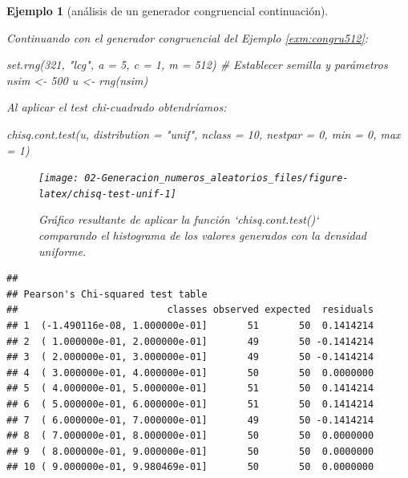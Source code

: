 \documentclass[
]{book}
\newenvironment{Shaded}{\begin{snugshade}}{\end{snugshade}}
\newcommand{\AttributeTok}[1]{\textcolor[rgb]{0.77,0.63,0.00}{#1}}
\newcommand{\CommentTok}[1]{\textcolor[rgb]{0.56,0.35,0.01}{\textit{#1}}}
\newcommand{\DecValTok}[1]{\textcolor[rgb]{0.00,0.00,0.81}{#1}}
\newcommand{\FunctionTok}[1]{\textcolor[rgb]{0.00,0.00,0.00}{#1}}
\newcommand{\NormalTok}[1]{#1}
\newcommand{\OtherTok}[1]{\textcolor[rgb]{0.56,0.35,0.01}{#1}}
\newcommand{\StringTok}[1]{\textcolor[rgb]{0.31,0.60,0.02}{#1}}
\theoremstyle{break}
\newtheorem{example}{Ejemplo}[chapter]
\theoremstyle{nonumberplain}
\begin{document}
\begin{example}[análisis de un generador congruencial continuación]
\protect\hypertarget{exm:congru512b}{}\label{exm:congru512b}

Continuando con el generador congruencial del Ejemplo \ref{exm:congru512}:

\begin{Shaded}
\begin{Highlighting}[]
\FunctionTok{set.rng}\NormalTok{(}\DecValTok{321}\NormalTok{, }\StringTok{"lcg"}\NormalTok{, }\AttributeTok{a =} \DecValTok{5}\NormalTok{, }\AttributeTok{c =} \DecValTok{1}\NormalTok{, }\AttributeTok{m =} \DecValTok{512}\NormalTok{)  }\CommentTok{\# Establecer semilla y parámetros}
\NormalTok{nsim }\OtherTok{\textless{}{-}} \DecValTok{500}
\NormalTok{u }\OtherTok{\textless{}{-}} \FunctionTok{rng}\NormalTok{(nsim)}
\end{Highlighting}
\end{Shaded}

Al aplicar el test chi-cuadrado obtendríamos:

\begin{Shaded}
\begin{Highlighting}[]
\FunctionTok{chisq.cont.test}\NormalTok{(u, }\AttributeTok{distribution =} \StringTok{"unif"}\NormalTok{, }
                \AttributeTok{nclass =} \DecValTok{10}\NormalTok{, }\AttributeTok{nestpar =} \DecValTok{0}\NormalTok{, }\AttributeTok{min =} \DecValTok{0}\NormalTok{, }\AttributeTok{max =} \DecValTok{1}\NormalTok{)}
\end{Highlighting}
\end{Shaded}

\begin{figure}[!htb]

{\centering \texttt{[image: 02-Generacion\_numeros\_aleatorios\_files/figure-latex/chisq-test-unif-1]} 

}

\caption{Gráfico resultante de aplicar la función `chisq.cont.test()` comparando el histograma de los valores generados con la densidad uniforme.}\label{fig:chisq-test-unif}
\end{figure}

\begin{verbatim}
## 
## Pearson's Chi-squared test table
##                          classes observed expected  residuals
## 1  (-1.490116e-08, 1.000000e-01]       51       50  0.1414214
## 2  ( 1.000000e-01, 2.000000e-01]       49       50 -0.1414214
## 3  ( 2.000000e-01, 3.000000e-01]       49       50 -0.1414214
## 4  ( 3.000000e-01, 4.000000e-01]       50       50  0.0000000
## 5  ( 4.000000e-01, 5.000000e-01]       51       50  0.1414214
## 6  ( 5.000000e-01, 6.000000e-01]       51       50  0.1414214
## 7  ( 6.000000e-01, 7.000000e-01]       49       50 -0.1414214
## 8  ( 7.000000e-01, 8.000000e-01]       50       50  0.0000000
## 9  ( 8.000000e-01, 9.000000e-01]       50       50  0.0000000
## 10 ( 9.000000e-01, 9.980469e-01]       50       50  0.0000000
\end{verbatim}


\end{example}
\end{document}
